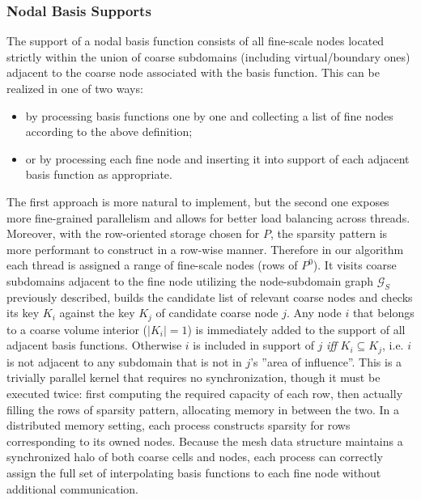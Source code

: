 \subsubsection{Nodal Basis Supports}
\label{subsubsec:par_kernels_support_nodes}

The support of a nodal basis function consists of all fine-scale nodes located strictly within the union of coarse subdomains (including virtual/boundary ones) adjacent to the coarse node associated with the basis function.   This can be realized in one of two ways:
\begin{itemize}
    \item by processing basis functions one by one and collecting a list of fine nodes according to the above definition;
    \item or by processing each fine node and inserting it into support of each adjacent basis function as appropriate.
\end{itemize}
The first approach is more natural to implement, but the second one exposes more fine-grained parallelism and allows for better load balancing across threads.   Moreover, with the row-oriented storage chosen for $P$, the sparsity pattern is more performant to construct in a row-wise manner.   Therefore in our algorithm each thread is assigned a range of fine-scale nodes (rows of $P^0$).   It visits coarse subdomains adjacent to the fine node utilizing the node-subdomain graph $\mathcal{G}_S$ previously described, builds the candidate list of relevant coarse nodes and checks its key $K_i$ against the key $K_j$ of candidate coarse node $j$.   Any node $i$ that belongs to a coarse volume interior ($|K_i| = 1$) is immediately added to the support of all adjacent basis functions.   Otherwise $i$ is included in support of $j$ \textit{iff} $K_i \subseteq K_j$, i.e. $i$ is not adjacent to any subdomain that is not in $j$'s ''area of influence''.   This is a trivially parallel kernel that requires no synchronization, though it must be executed twice: first computing the required capacity of each row, then actually filling the rows of sparsity pattern, allocating memory in between the two.   In a distributed memory setting, each process constructs sparsity for rows corresponding to its owned nodes.   Because the mesh data structure maintains a synchronized halo of both coarse cells and nodes, each process can correctly assign the full set of interpolating basis functions to each fine node without additional communication.

